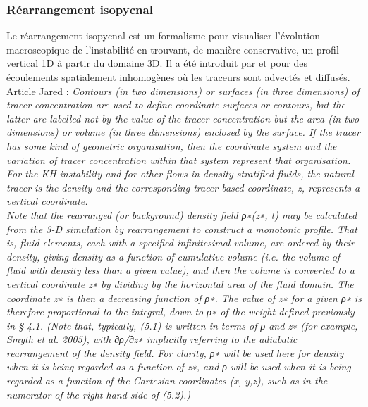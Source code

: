 \documentclass[a4paper,12pt]{article}
\begin{document}
    
        \subsubsection{Réarrangement isopycnal}
        
        Le réarrangement isopycnal est un formalisme pour visualiser l'évolution macroscopique de l'instabilité en trouvant, de manière conservative, un profil vertical 1D à partir du domaine 3D. Il a été introduit par \citep{nakamura_two-dimensional_1996} et \citep*{winters_diascalar_1996} pour des écoulements spatialement inhomogènes où les traceurs sont advectés et diffusés. \\
        \newline
        Article Jared : \textit{Contours (in two dimensions) or surfaces (in three dimensions) of tracer concentration are used to define coordinate surfaces or contours, but the latter are labelled not by the value of the tracer concentration but the area (in two dimensions) or volume (in three dimensions) enclosed by the surface. If the tracer has some kind of geometric organisation, then the coordinate system and the variation of tracer concentration within that system represent that organisation. For the KH instability and for other flows in density-stratified fluids, the natural tracer is the density and the corresponding tracer-based coordinate, z\∗, represents a vertical coordinate. \\
        Note that the rearranged (or background) density field ρ∗(z∗, t) may be calculated from the 3-D simulation by rearrangement to construct a monotonic profile. That is, fluid elements, each with a specified infinitesimal volume, are ordered by their density, giving density as a function of cumulative volume (i.e. the volume of fluid with density less than a given value), and then the volume is converted to a vertical coordinate z∗ by dividing by the horizontal area of the fluid domain. The coordinate z∗ is then a decreasing function of ρ∗. The value of z∗ for a given ρ∗ is therefore proportional to the integral, down to ρ∗ of the weight defined previously in § 4.1. (Note that, typically, (5.1) is written in terms of ρ and z∗ (for example, Smyth et al. 2005), with ∂ρ/∂z∗ implicitly referring to the adiabatic rearrangement of the density field. For clarity, ρ∗ will be used here for density when it is being regarded as a function of z∗, and ρ will be used when it is being regarded as a function of the Cartesian coordinates (x, y,z), such as in the numerator of the right-hand side of (5.2).)}
        \newline
\end{document}
